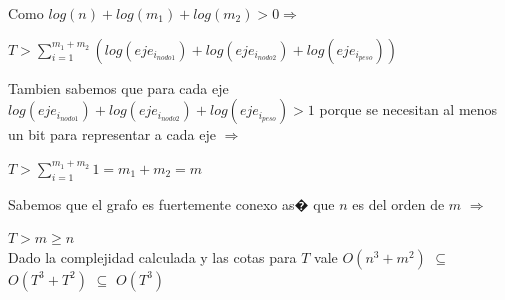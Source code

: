 \documentclass[11pt, a4paper, spanish]{article}
\begin{document}
	\noindent Como $log(n) + log(m_{1}) + log(m_{2}) > 0 \Rightarrow$
	\begin{center}
	$T > \displaystyle\sum_{i=1}^{m_{1} + m_{2}}{(log(eje_{i_{nodo1}})+log(eje_{i_{nodo2}}) + log(eje_{i_{peso}}))}$\\
	\end{center}

	\noindent Tambien sabemos que para cada eje $log(eje_{i_{nodo1}})+log(eje_{i_{nodo2}}) + log(eje_{i_{peso}}) > 1$ porque se necesitan al menos un bit para representar a cada eje $\Rightarrow$\\
	\begin{center}
	$T > \displaystyle\sum_{i=1}^{m_{1} + m_{2}}{1} = m_{1} + m_{2} = m$ \\
	\end{center}
	Sabemos que el grafo es fuertemente conexo as� que $n$ es del orden de $m$ $\Rightarrow$

	\begin{center}
	$T > m \geq n$ \\
	Dado la complejidad calculada y las cotas para $T$ vale $O(n^{3} + m^{2})$ $\subseteq$ $O(T^{3}+T^{2})$ $\subseteq$ $O(T^{3})$
	\end{center}
\newpage
\end{document}
